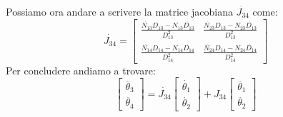 Possiamo ora andare a scrivere la matrice jacobiana $\dot{J_{34}}$ come:
\begin{equation}
    \dot{J_{34}} =
    \begin{bmatrix}
    \frac{\dot{N_{13}}D_{13}-N_{13}\dot{D_{13}}}{D_{13}^2} & 
     \frac{\dot{N_{23}}D_{13}-N_{23}\dot{D_{13}}}{D_{13}^2} \\
    \frac{\dot{N_{14}}D_{14}-N_{14}\dot{D_{14}}}{D_{14}^2} &
     \frac{\dot{N_{24}}D_{14}-N_{24}\dot{D_{14}}}{D_{14}^2}
    \end{bmatrix}
\end{equation}
Per concludere andiamo a trovare:
\begin{equation}
    \begin{bmatrix}
    \ddot{\theta_3} \\ \ddot{\theta_4}
    \end{bmatrix}
    = 
    \dot{J_{34}}\begin{bmatrix}
    \dot{\theta_1} \\ \dot{\theta_2}
    \end{bmatrix} + 
    J_{34} \begin{bmatrix}
    \ddot{\theta_1} \\ \ddot{\theta_2}
    \end{bmatrix}
\end{equation}
